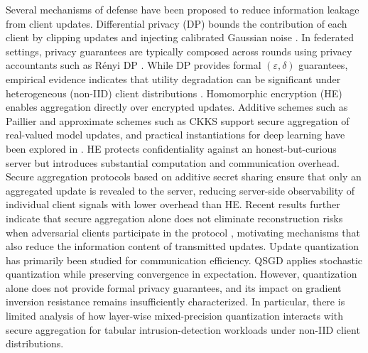 \documentclass[journal,twoside,web]{ieeecolor}
\begin{document}
Several mechanisms of defense have been proposed to reduce information leakage from client updates. Differential privacy (DP) bounds the contribution of each client by clipping updates and injecting calibrated Gaussian noise \cite{dwork2014dp,abadi2016dp}. In federated settings, privacy guarantees are typically composed across rounds using privacy accountants such as R\'enyi DP \cite{mironov2017rdp}. While DP provides formal $(\varepsilon,\delta)$ guarantees, empirical evidence indicates that utility degradation can be significant under heterogeneous (non-IID) client distributions \cite{geyer2017dpfl}. Homomorphic encryption (HE) enables aggregation directly over encrypted updates. Additive schemes such as Paillier \cite{paillier1999} and approximate schemes such as CKKS \cite{cheon2017ckks} support secure aggregation of real-valued model updates, and practical instantiations for deep learning have been explored in \cite{phong2018he}. HE protects confidentiality against an honest-but-curious server but introduces substantial computation and communication overhead. Secure aggregation protocols based on additive secret sharing \cite{shamir1979,bonawitz2017secureagg} ensure that only an aggregated update is revealed to the server, reducing server-side observability of individual client signals with lower overhead than HE. Recent results further indicate that secure aggregation alone does not eliminate reconstruction risks when adversarial clients participate in the protocol \cite{Sun2024ClientSideGIA}, motivating mechanisms that also reduce the information content of transmitted updates. Update quantization has primarily been studied for communication efficiency. QSGD \cite{alistarh2017qsgd} applies stochastic quantization while preserving convergence in expectation. However, quantization alone does not provide formal privacy guarantees, and its impact on gradient inversion resistance remains insufficiently characterized.  In particular, there is limited analysis of how layer-wise mixed-precision quantization interacts with secure aggregation for tabular intrusion-detection workloads under non-IID client distributions.


\end{document}
